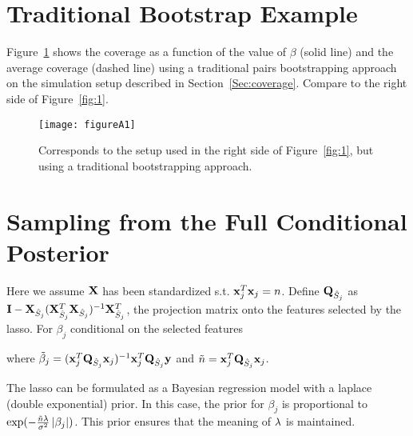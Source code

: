 \section{Traditional Bootstrap Example}
\label{sec:boot-fail}

Figure~\ref{fig:A1} shows the coverage as a function of the value of $\beta$ (solid line) and the average coverage (dashed line) using a traditional pairs bootstrapping approach on the simulation setup described in Section~\ref{Sec:coverage}. Compare to the right side of Figure~\ref{fig:1}.

\begin{figure}[hbtp]
  \begin{center}
  \texttt{[image: figureA1]}
  \caption{\label{fig:A1} Corresponds to the setup used in the right side of Figure~\ref{fig:1}, but using a traditional bootstrapping approach.}
  \end{center}
\end{figure}

\clearpage

\section{Sampling from the Full Conditional Posterior}\label{Sup:A}

Here we assume $\mathbf{X}$ has been standardized s.t. $\mathbf{x}_j^T\mathbf{x}_j = n$. Define $\mathbf{Q}_{\hat{S}_j}$ as $\mathbf{I} - \mathbf{X}_{\hat{S}_j}(\mathbf{X}_{\hat{S}_j}^T \mathbf{X}_{\hat{S}_j})^{-1} \mathbf{X}_{\hat{S}_j}^T$, the projection matrix onto the features selected by the lasso. For $\beta_j$ conditional on the selected features


\noindent where $\tilde{\beta}_j = (\mathbf{x}_j^T \mathbf{Q}_{\hat{S}_j} \mathbf{x}_j)^{-1} \mathbf{x}_j^T \mathbf{Q}_{\hat{S}_j} \mathbf{y}$ and $\tilde{n} = \mathbf{x}_j^T \mathbf{Q}_{\hat{S}_j} \mathbf{x}_j$.

The lasso can be formulated as a Bayesian regression model with a laplace (double exponential) prior. In this case, the prior for $\beta_j$ is proportional to $\exp(-\frac{\tilde{n} \lambda} {\sigma^2} \left\lvert\beta_j\right\rvert)$. This prior ensures that the meaning of $\lambda$ is maintained.

